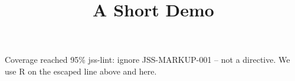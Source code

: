 \documentclass[article]{jss}
\title{A Short Demo}
\begin{document}
Coverage reached 95\% jss-lint: ignore JSS-MARKUP-001 -- not a directive.
We use R on the escaped line above and here.
\end{document}
